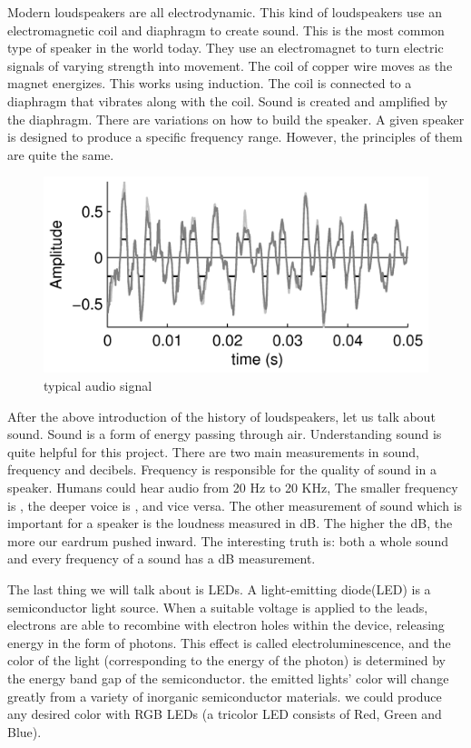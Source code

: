 \documentclass[12pt,a4paper,journal]{IEEEtran}
\begin{document}
Modern loudspeakers are all electrodynamic. This kind of loudspeakers use an electromagnetic coil and diaphragm to create sound. This is the most common type of speaker in the world today. They use an electromagnet to turn electric signals of varying strength into movement. The coil of copper wire moves as the magnet energizes. This works using induction. The coil is connected to a diaphragm that vibrates along with the coil. Sound is created and amplified by the diaphragm. There are variations on how to build the speaker. A given speaker is designed to produce a specific frequency range. However, the principles of them are quite the same.
\begin{figure}[h]
  \centering
  \includegraphics[width=0.9\linewidth]{audiosignal.png}
  \caption{typical audio signal}
  \label{fig:as}
\end{figure}

After the above introduction of the history of loudspeakers, let us talk about sound. Sound is a form of energy passing through air. Understanding sound is quite helpful for this project. There are two main measurements in sound, frequency and decibels. Frequency is responsible for the quality of sound in a speaker. Humans could hear audio from 20 Hz to 20 KHz, The smaller frequency is , the deeper voice is , and vice versa. The other measurement of sound which is important for a speaker is the loudness measured in dB. The higher the dB, the more our eardrum pushed inward. The interesting truth is: both a whole sound and every frequency of a sound has a dB measurement.

The last thing we will talk about is LEDs. A light-emitting diode(LED) is a semiconductor light source. When a suitable voltage is applied to the leads, electrons are able to recombine with electron holes within the device, releasing energy in the form of photons. This effect is called electroluminescence, and the color of the light (corresponding to the energy of the photon) is determined by the energy band gap of the semiconductor. the emitted lights' color will change greatly from a variety of inorganic semiconductor materials. we could produce any desired color with RGB LEDs (a tricolor LED consists of Red, Green and Blue).
\end{document}
